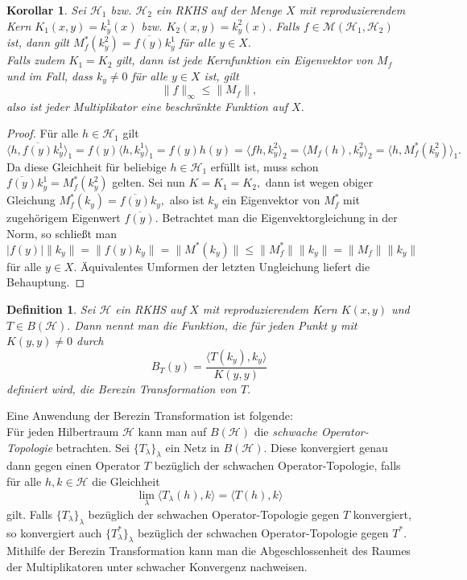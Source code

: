 \documentclass[12pt,titlepage,twoside,cleardoublepage]{article}
\theoremstyle{nummermitklammern}
\newtheorem{korollar}[temp]{Korollar}
\newtheorem{definition}[temp]{Definition}
\newtheorem{definition}[zahl]{Definition}
\numberwithin{equation}{section}
\newtheorem{korollar}[zahl]{Korollar}
\begin{document}
\begin{korollar}
Sei $\mathcal{H}_1$ bzw. $\mathcal{H}_2$ ein RKHS auf der Menge $X$ mit reproduzierendem Kern $K_1(x,y)=k^1_y(x)$ bzw. $K_2(x,y)=k^2_y(x).$ Falls $f\in \mathcal{M}(\mathcal{H}_1,\mathcal{H}_2)$ ist, dann gilt $M^*_f(k^2_y)=\overline{f(y)}k_y^1$ für alle $ y\in X.$ \\
Falls zudem $K_1=K_2$ gilt, dann ist jede Kernfunktion ein Eigenvektor von $M_f$ und im Fall, dass $k_y\neq 0$ für alle $y\in X$ ist, gilt
\[
\|f\|_{\infty}\leq \|M_f\|,
\]
also ist jeder Multiplikator eine beschränkte Funktion auf $X$.
\end{korollar}
\begin{proof}
Für alle $h \in \mathcal{H}_1$ gilt
\[
\langle h,\overline{f(y)}k^1_y \rangle_1=f(y)\langle h,k^1_y \rangle_1=f(y)h(y)=\langle fh,k_y^2 \rangle_2=\langle M_f(h),k^2_y \rangle_2=\langle h,M^*_f(k^2_y)\rangle_1.
\]
Da diese Gleichheit für beliebige $h\in \mathcal{H}_1$ erfüllt ist, muss schon $\overline{f(y)}k^1_y=M^*_f(k^2_y)$  gelten.
Sei nun $K=K_1=K_2,$ dann ist wegen obiger Gleichung $M^*_f(k_y)=\overline{f(y)}k_y,$ also ist $k_y$ ein Eigenvektor von $M^*_f$ mit zugehörigem Eigenwert $\overline{f(y)}$. Betrachtet man die Eigenvektorgleichung in der Norm, so schließt man
\[
\vert f(y)\vert\|k_y\|=\|f(y)k_y\|=\|M^{*}(k_y)\|\leq \|M^*_f\|\|k_y\|=\|M_f\|\|k_y\| 
\] für alle $y\in X.$
Äquivalentes Umformen der letzten Ungleichung liefert die Behauptung.

\end{proof}
\begin{definition} 
Sei $\mathcal{H}$ ein RKHS auf $X$ mit reproduzierendem Kern $K(x,y)$ und $T\in B(\mathcal{H}).$ Dann nennt man die Funktion, die für jeden Punkt $y$ mit $K(y,y)\neq 0$ durch
\[
B_T(y)=\frac{\langle T(k_y),k_y \rangle}{K(y,y)}
\]
 definiert wird, die \emph{Berezin Transformation} von $T.$
 \end{definition}
 Eine Anwendung der Berezin Transformation ist folgende:\\
 Für jeden Hilbertraum $\mathcal{H}$ kann man auf  $B(\mathcal{H})$ die \emph{schwache Operator-Topologie} betrachten. 
 Sei $\{T_{\lambda}\}_{\lambda}$ ein Netz in $B(\mathcal{H}).$ Diese konvergiert genau dann gegen einen Operator $T$ bezüglich der schwachen Operator-Topologie, falls für alle $h,k\in \mathcal{H}$ die Gleichheit 
 \[
\lim_{\lambda}\langle T_\lambda(h),k \rangle=\langle T(h),k\rangle  
 \] gilt. Falls $\{T_{\lambda}\}_{\lambda}$ bezüglich der schwachen Operator-Topologie gegen $T$ konvergiert, so konvergiert auch $\{T_{\lambda}^*\}_{\lambda}$ bezüglich der schwachen Operator-Topologie gegen $T^*.$ Mithilfe der Berezin Transformation kann man die Abgeschlossenheit des Raumes der Multiplikatoren unter schwacher Konvergenz nachweisen.
\end{document}
